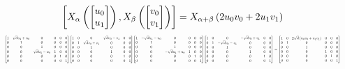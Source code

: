 \documentclass[11pt]{article}
\theoremstyle{definition}
\begin{document}
\[
\scaletoalign{\textwidth}{\left[ X_{\alpha}\left(\left[\begin{matrix}u_{0}\\u_{1}\end{matrix}\right]\right), X_{\beta}\left(\left[\begin{matrix}v_{0}\\v_{1}\end{matrix}\right]\right) \right] = X_{\alpha + \beta}\left(2 u_{0} v_{0} + 2 u_{1} v_{1}\right)}
\]
\[
\scaletoalign{\textwidth}{{\left[\begin{matrix}1 & \sqrt{d} u_{1} + u_{0} & 0 & 0 & 0 & 0\\0 & 1 & 0 & 0 & 0 & 0\\0 & 0 & 1 & 0 & 0 & 0\\0 & 0 & \sqrt{d} u_{1} - u_{0} & 1 & 0 & 0\\0 & 0 & 0 & 0 & 1 & 0\\0 & 0 & 0 & 0 & 0 & 1\end{matrix}\right]} {\left[\begin{matrix}1 & 0 & 0 & \sqrt{d} v_{0} - v_{1} & 0 & 0\\0 & 1 & \sqrt{d} v_{0} + v_{1} & 0 & 0 & 0\\0 & 0 & 1 & 0 & 0 & 0\\0 & 0 & 0 & 1 & 0 & 0\\0 & 0 & 0 & 0 & 1 & 0\\0 & 0 & 0 & 0 & 0 & 1\end{matrix}\right]} {\left[\begin{matrix}1 & - \sqrt{d} u_{1} - u_{0} & 0 & 0 & 0 & 0\\0 & 1 & 0 & 0 & 0 & 0\\0 & 0 & 1 & 0 & 0 & 0\\0 & 0 & - \sqrt{d} u_{1} + u_{0} & 1 & 0 & 0\\0 & 0 & 0 & 0 & 1 & 0\\0 & 0 & 0 & 0 & 0 & 1\end{matrix}\right]} {\left[\begin{matrix}1 & 0 & 0 & - \sqrt{d} v_{0} + v_{1} & 0 & 0\\0 & 1 & - \sqrt{d} v_{0} - v_{1} & 0 & 0 & 0\\0 & 0 & 1 & 0 & 0 & 0\\0 & 0 & 0 & 1 & 0 & 0\\0 & 0 & 0 & 0 & 1 & 0\\0 & 0 & 0 & 0 & 0 & 1\end{matrix}\right]} = {\left[\begin{matrix}1 & 0 & 2 \sqrt{d} \left(u_{0} v_{0} + u_{1} v_{1}\right) & 0 & 0 & 0\\0 & 1 & 0 & 0 & 0 & 0\\0 & 0 & 1 & 0 & 0 & 0\\0 & 0 & 0 & 1 & 0 & 0\\0 & 0 & 0 & 0 & 1 & 0\\0 & 0 & 0 & 0 & 0 & 1\end{matrix}\right]}}
\]
\end{document}
